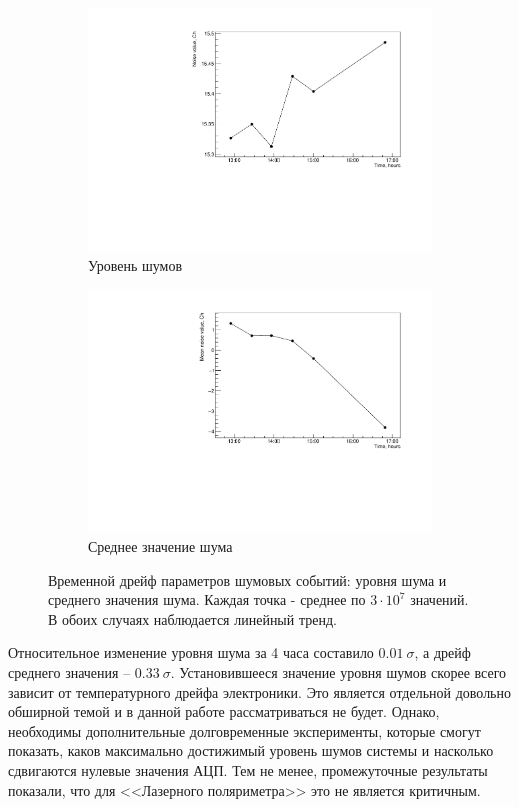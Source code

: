 \begin{figure}[h]
	\centering
	\begin{subfigure}{.5\textwidth}
		\centering
		\includegraphics[width=1\linewidth]{img/Noise_time_drift.pdf}
		\caption{Уровень шумов}
	\end{subfigure}%
	\begin{subfigure}{.5\textwidth}
		\centering
		\includegraphics[width=1\linewidth]{img/Mean_time_drift.pdf}
		\caption{Среднее значение шума}
	\end{subfigure}
	\caption{Временной дрейф параметров шумовых событий: уровня шума и среднего значения шума. Каждая точка - среднее по $3\cdot10^7$ значений. В обоих случаях наблюдается линейный тренд.}
	\label{fig:Noise_gr}
\end{figure}
Относительное изменение уровня шума за 4 часа составило $0.01~\sigma$, а дрейф среднего значения -- $0.33~\sigma$. Установившееся значение уровня шумов скорее всего зависит от температурного дрейфа электроники. Это является отдельной довольно обширной темой и в данной работе рассматриваться не будет. Однако, необходимы дополнительные долговременные эксперименты, которые смогут показать, каков максимально достижимый уровень шумов системы и насколько сдвигаются нулевые значения АЦП. Тем не менее, промежуточные результаты показали, что для <<Лазерного поляриметра>> это не является критичным.  

